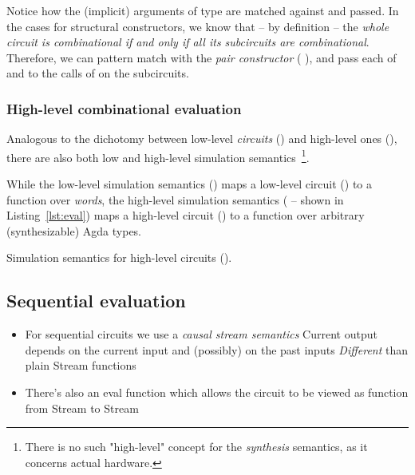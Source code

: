             Notice how the (implicit) arguments of type   are matched against and passed.
            In the cases for structural constructors, we know that – by definition – the
            \emph{whole circuit is combinational if and only if all its subcircuits are combinational}.
            Therefore, we can pattern match with the \emph{pair constructor} ( \AI{,} ),
            and pass each of  and  to the calls of  on the subcircuits.

            \subsubsection{High-level combinational evaluation}
            Analogous to the dichotomy between low-level \emph{circuits} () and high-level ones (),
            there are also both low and high-level simulation
            semantics~\footnote{There is no such "high-level" concept for the \emph{synthesis} semantics,
                as it concerns actual hardware.}.

            While the low-level simulation semantics () maps a low-level circuit ()
            to a function over \emph{words},
            the high-level simulation semantics ( – shown in Listing~\ref{lst:eval})
            maps a high-level circuit () to a function over arbitrary (synthesizable) Agda types.

            \begin{listing}[ht]
                \caption{Simulation semantics for high-level circuits ().\label{lst:eval}}
            \end{listing}


        \subsection{Sequential evaluation}
        \label{subsec:sequential-eval}
            \begin{itemize}
                \item For sequential circuits we use a \emph{causal stream semantics}
                    \subitem Current output depends on the current input and (possibly) on the past inputs
                    \subitem \emph{Different} than plain Stream functions

                \item There's also an eval function which allows the circuit to be viewed as function from Stream to Stream
            \end{itemize}

